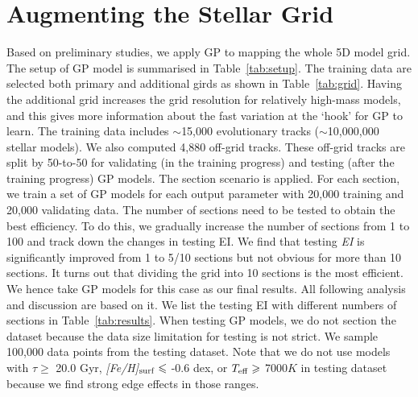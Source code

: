 \section{Augmenting the Stellar Grid}\label{sec:results}

Based on preliminary studies, we apply GP to mapping the whole 5D model grid. The setup of GP model is summarised in Table~\ref{tab:setup}. 
%
The training data are selected both primary and additional girds as shown in Table~\ref{tab:grid}. Having the additional grid increases the grid resolution for relatively high-mass models, and this gives more information about the fast variation at the `hook' for GP to learn.  
%
The training data includes $\sim$15,000 evolutionary tracks ($\sim$10,000,000 stellar models). 
%
We also computed 4,880 off-grid tracks. These off-grid tracks are split by 50-to-50 for validating (in the training progress) and testing (after the training progress) GP models.
%
The section scenario is applied. For each section, we train a set of GP models for each output parameter with 20,000 training and 20,000 validating data.
% 
The number of sections need to be tested to obtain the best efficiency. To do this, we gradually increase the number of sections from 1 to 100 and track down the changes in testing EI. We find that testing {\it EI} is significantly improved from 1 to 5/10 sections but not obvious for more than 10 sections. It turns out that dividing the grid into 10 sections is the most efficient. We hence take GP models for this case as our final results. All following analysis and discussion are based on it. We list the testing EI with different numbers of sections in Table~\ref{tab:results}. 
%
When testing GP models, we do not section the dataset because the data size limitation for testing is not strict. We sample 100,000 data points from the testing dataset. Note that we do not use models with $\tau \geq$ 20.0 Gyr, {\it [Fe/H]}$_{\rm surf} \leq$ -0.6 dex, or $T_{\rm eff} \geq$ 7000$K$ in testing dataset because we find strong edge effects in those ranges. 

